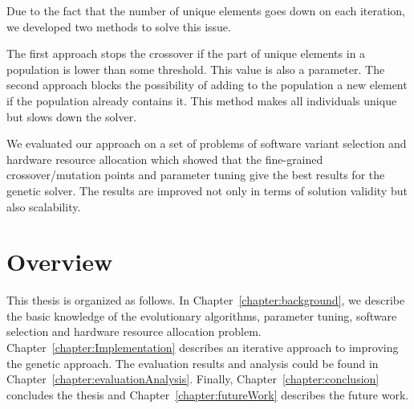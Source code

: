 Due to the fact that the number of unique elements goes down on each iteration, we developed two methods to solve this issue.

The first approach stops the crossover if the part of unique elements in a population is lower than some threshold. This value is also a parameter. 
The second approach blocks the possibility of adding to the population a new element if the population already contains it. This method makes all individuals unique but slows down the solver.

We evaluated our approach on a set of problems of software variant selection and hardware resource allocation which showed that the fine-grained crossover/mutation points and parameter tuning give the best results for the genetic solver. The results are improved not only in terms of solution validity but also scalability.


\section{Overview}
This thesis is organized as follows. In Chapter~\ref{chapter:background}, we describe the basic knowledge of the evolutionary algorithms, parameter tuning,  software selection and hardware resource allocation problem. Chapter~\ref{chapter:Implementation} describes an iterative approach to improving the genetic approach. The evaluation results and analysis could be found in Chapter~\ref{chapter:evaluationAnalysis}. Finally, Chapter~\ref{chapter:conclusion} concludes the thesis and Chapter~\ref{chapter:futureWork} describes the future work.
